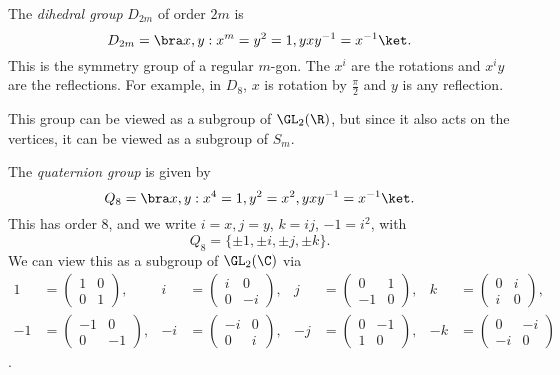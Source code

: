 \documentclass[a4paper]{article}
\begin{document}
\begin{defi}
  The \emph{dihedral group} $D_{2m}$ of order $2m$ is
  \[
    D_{2m} = \bra x, y: x^m = y^2 = 1, yxy^{-1} = x^{-1}\ket.
  \]
  This is the symmetry group of a regular $m$-gon. The $x^i$ are the rotations and $x^i y$ are the reflections. For example, in $D_8$, $x$ is rotation by $\frac{\pi}{2}$ and $y$ is any reflection.

  This group can be viewed as a subgroup of $\GL_2(\R)$, but since it also acts on the vertices, it can be viewed as a subgroup of $S_m$.
\end{defi}

\begin{defi}
  The \emph{quaternion group} is given by
  \[
    Q_8 = \bra x, y: x^4 = 1, y^2 = x^2, yxy^{-1} = x^{-1}\ket.
  \]
  This has order $8$, and we write $i = x, j = y$, $k = ij$, $-1 = i^2$, with
  \[
    Q_8 = \{\pm 1, \pm i, \pm j, \pm k\}.
  \]
  We can view this as a subgroup of $\GL_2(\C)$ via
  \begin{align*}
    1 &= \begin{pmatrix}
      1&0\\0&1
    \end{pmatrix},&
    i &= \begin{pmatrix}
      i & 0\\0&-i
    \end{pmatrix},&
    j &= \begin{pmatrix}
      0&1\\-1&0
    \end{pmatrix},&
    k &= \begin{pmatrix}
      0&i\\i&0
    \end{pmatrix},\\
    -1 &= \begin{pmatrix}
      -1&0\\0&-1
    \end{pmatrix},&
    -i &= \begin{pmatrix}
      -i & 0\\0&i
    \end{pmatrix},&
    -j &= \begin{pmatrix}
      0&-1\\1&0
    \end{pmatrix},&
    -k &= \begin{pmatrix}
      0&-i\\-i&0
    \end{pmatrix}
  \end{align*}.
\end{defi}
\end{document}
